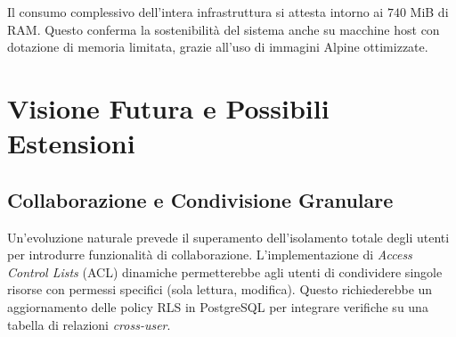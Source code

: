 \documentclass[12pt,a4paper]{report}
\begin{document}
\begin{table}[htbp]
  \centering
  \caption{Report istantaneo del consumo di risorse rilevato tramite
  il comando \texttt{docker stats}.}
  \label{tab:docker_stats}
\end{table}

Il consumo complessivo dell'intera infrastruttura si attesta intorno ai $740$
MiB di RAM. Questo conferma la sostenibilità del sistema anche su
macchine host con dotazione di memoria limitata, grazie all'uso di
immagini Alpine ottimizzate.

\section{Visione Futura e Possibili Estensioni}

\subsection{Collaborazione e Condivisione Granulare}
Un'evoluzione naturale prevede il superamento dell'isolamento totale degli
utenti per introdurre funzionalità di collaborazione. L'implementazione di
\textit{Access Control Lists} (ACL) dinamiche permetterebbe agli utenti di
condividere singole risorse con permessi specifici (sola lettura, modifica).
Questo richiederebbe un aggiornamento delle policy RLS in PostgreSQL per
integrare verifiche su una tabella di relazioni \textit{cross-user}.
\end{document}
